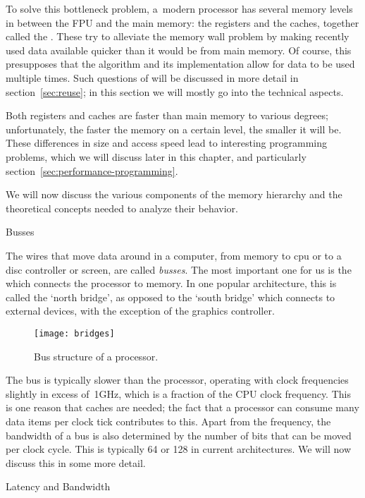 To solve this bottleneck problem,
a~modern processor has several memory levels in between the
\ac{FPU} and the main memory: the registers
and the caches, together called the
. These try to alleviate the memory
wall problem by making recently used data available quicker than it
would be from main memory. Of course, this presupposes that the
algorithm and its implementation allow for data to be used multiple
times.  Such questions of  will be discussed in
more detail in section~\ref{sec:reuse}; in this section we
will mostly go into the technical aspects.

Both registers and caches are faster
than main memory to various degrees; unfortunately, the faster the memory on a certain
level, the smaller it will be.
These differences in size and access speed lead to interesting programming
problems, which we will discuss later in this chapter, and
particularly section~\ref{sec:performance-programming}.

We will now discuss the various components of the memory hierarchy and
the theoretical concepts needed to analyze their behavior.

 {Busses}

The wires that move data around in a computer, from memory to cpu or
to a disc controller or screen, are called \emph{busses}. The
most important one for us is the  which connects the processor to memory. In one popular
architecture, this is called the `north bridge', as opposed to the
`south bridge' which connects to external devices, with the exception
of the graphics controller.

\begin{figure}[ht]
\texttt{[image: bridges]}
\caption{Bus structure of a processor.}
\end{figure}

The bus is typically slower than the processor, operating with clock
frequencies slightly in excess of~1GHz, which is a fraction of the \ac{CPU}
clock frequency.  This is one reason that caches are needed; the fact
that a processor can consume many data items per clock tick
contributes to this. Apart from the frequency, the bandwidth of a bus is
also determined by the number of bits that can be moved per clock
cycle. This is typically 64 or 128 in current architectures. We will
now discuss this in some more detail.

 {Latency and Bandwidth}
\label{sec:latencybandwidth}

